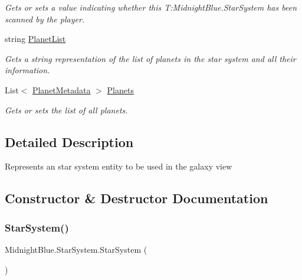 \begin{DoxyCompactItemize}
\begin{DoxyCompactList}\small\item\em Gets or sets a value indicating whether this T\+:\+Midnight\+Blue.\+Star\+System has been scanned by the player. \end{DoxyCompactList}\item 
string \hyperlink{class_midnight_blue_1_1_star_system_af74f3d59d7010d0d0a57549f7bbd2639}{Planet\+List}
\begin{DoxyCompactList}\small\item\em Gets a string representation of the list of planets in the star system and all their information. \end{DoxyCompactList}\item 
List$<$ \hyperlink{class_midnight_blue_1_1_planet_metadata}{Planet\+Metadata} $>$ \hyperlink{class_midnight_blue_1_1_star_system_a041dfe27c393065732ea841516388c50}{Planets}
\begin{DoxyCompactList}\small\item\em Gets or sets the list of all planets. \end{DoxyCompactList}\end{DoxyCompactItemize}


\subsection{Detailed Description}
Represents an star system entity to be used in the galaxy view 



\subsection{Constructor \& Destructor Documentation}
\hypertarget{class_midnight_blue_1_1_star_system_a781acf7d61cc1609bc0f5db94593a963}{}\label{class_midnight_blue_1_1_star_system_a781acf7d61cc1609bc0f5db94593a963} 
\subsubsection{\texorpdfstring{Star\+System()}{StarSystem()}}
{\footnotesize\ttfamily Midnight\+Blue.\+Star\+System.\+Star\+System (\begin{DoxyParamCaption}{ }\end{DoxyParamCaption})\hspace{0.3cm}{\ttfamily [inline]}}



